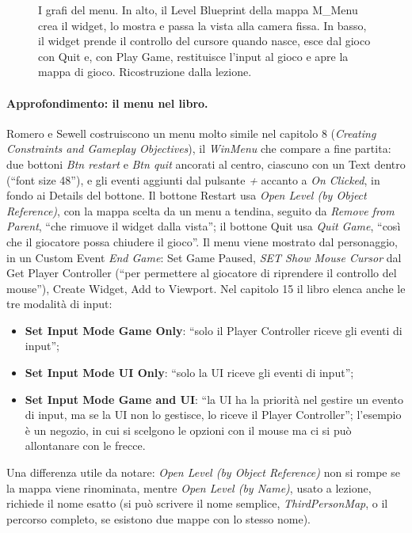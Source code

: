 \begin{figure}[htbp]
\caption{I grafi del menu. In alto, il Level Blueprint della mappa M\_Menu crea il widget,
lo mostra e passa la vista alla camera fissa. In basso, il widget prende il controllo del
cursore quando nasce, esce dal gioco con Quit e, con Play Game, restituisce l'input al
gioco e apre la mappa di gioco. Ricostruzione dalla lezione.}
\label{ue12:fig:menugraph}
\end{figure}

\paragraph{Approfondimento: il menu nel libro.} Romero e Sewell costruiscono un menu molto
simile nel capitolo 8 (\emph{Creating Constraints and Gameplay Objectives}), il
\emph{WinMenu} che compare a fine partita: due bottoni \emph{Btn restart} e \emph{Btn
quit} ancorati al centro, ciascuno con un Text dentro (``font size 48''), e gli eventi
aggiunti dal pulsante \emph{+} accanto a \emph{On Clicked}, in fondo ai Details del bottone.
Il bottone Restart usa \emph{Open Level (by Object Reference)}, con la mappa scelta da un
menu a tendina, seguito da \emph{Remove from Parent}, ``che rimuove il widget dalla
vista''; il bottone Quit usa \emph{Quit Game}, ``così che il giocatore possa chiudere il
gioco''. Il menu viene mostrato dal personaggio, in un Custom Event \emph{End Game}: Set
Game Paused, \emph{SET Show Mouse Cursor} dal Get Player Controller (``per permettere al
giocatore di riprendere il controllo del mouse''), Create Widget, Add to Viewport. Nel
capitolo 15 il libro elenca anche le tre modalità di input:
\begin{itemize}
  \item \textbf{Set Input Mode Game Only}: ``solo il Player Controller riceve gli eventi
        di input'';
  \item \textbf{Set Input Mode UI Only}: ``solo la UI riceve gli eventi di input'';
  \item \textbf{Set Input Mode Game and UI}: ``la UI ha la priorità nel gestire un evento
        di input, ma se la UI non lo gestisce, lo riceve il Player Controller''; l'esempio
        è un negozio, in cui si scelgono le opzioni con il mouse ma ci si può allontanare
        con le frecce.
\end{itemize}
Una differenza utile da notare: \emph{Open Level (by Object Reference)} non si rompe se la
mappa viene rinominata, mentre \emph{Open Level (by Name)}, usato a lezione, richiede il
nome esatto (si può scrivere il nome semplice, \emph{ThirdPersonMap}, o il percorso
completo, se esistono due mappe con lo stesso nome).

